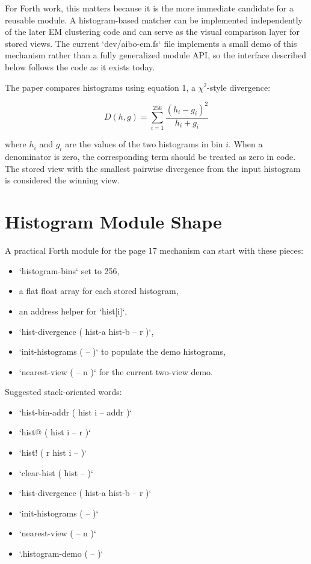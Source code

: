 \documentclass[11pt]{article}
\begin{document}
For Forth work, this matters because it is the more immediate candidate for a reusable module. A histogram-based matcher can be implemented independently of the later EM clustering code and can serve as the visual comparison layer for stored views. The current `dev/aibo-em.fs` file implements a small demo of this mechanism rather than a fully generalized module API, so the interface described below follows the code as it exists today.

The paper compares histograms using equation 1, a $\chi^2$-style divergence:

\begin{equation}
D(h, g) = \sum_{i=1}^{256} \frac{(h_i - g_i)^2}{h_i + g_i}
\end{equation}

where $h_i$ and $g_i$ are the values of the two histograms in bin $i$. When a denominator is zero, the corresponding term should be treated as zero in code. The stored view with the smallest pairwise divergence from the input histogram is considered the winning view.

\section*{Histogram Module Shape}

A practical Forth module for the page 17 mechanism can start with these pieces:

\begin{itemize}
\item `histogram-bins` set to 256,
\item a flat float array for each stored histogram,
\item an address helper for `hist[i]`,
\item `hist-divergence ( hist-a hist-b -- r )`,
\item `init-histograms ( -- )` to populate the demo histograms,
\item `nearest-view ( -- n )` for the current two-view demo.
\end{itemize}

Suggested stack-oriented words:

\begin{itemize}
\item `hist-bin-addr ( hist i -- addr )`
\item `hist@ ( hist i -- r )`
\item `hist! ( r hist i -- )`
\item `clear-hist ( hist -- )`
\item `hist-divergence ( hist-a hist-b -- r )`
\item `init-histograms ( -- )`
\item `nearest-view ( -- n )`
\item `.histogram-demo ( -- )`
\end{itemize}
\end{document}
